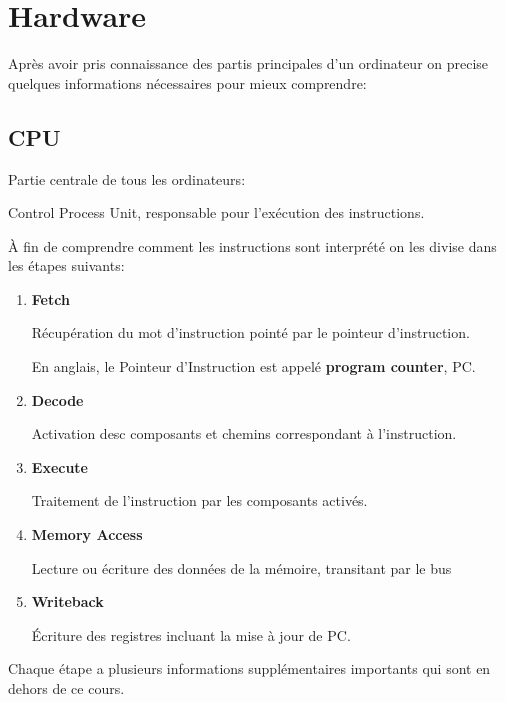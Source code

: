 \documentclass{article}
\begin{document}
\section{Hardware}
Après avoir pris connaissance des partis principales d'un ordinateur on precise quelques informations nécessaires pour mieux comprendre:
\subsection{CPU}
Partie centrale de tous les ordinateurs:
\begin{definition}\label{def:CPU}
    Control Process Unit, responsable pour l'exécution des instructions.
\end{definition}
À fin de comprendre comment les instructions sont interprété on les divise dans les étapes suivants:
\begin{enumerate}[rightmargin=\leftmargin]
    \item \textbf{Fetch}
    \begin{definition}\label{def:fetch}
        Récupération du mot d'instruction pointé par le pointeur d'instruction.
    
    \end{definition}
    En anglais, le Pointeur d'Instruction est appelé \textbf{program counter}, PC.
    
    \item \textbf{Decode}
    \begin{definition}\label{def:decode}
        Activation desc composants et chemins correspondant à l'instruction.
    \end{definition}
    
    \item \textbf{Execute}
    \begin{definition}\label{def:execute}
        Traitement de l'instruction par les composants activés.
    \end{definition}
    
    \item \textbf{Memory Access}
    \begin{definition}\label{def:memoryAccess}
        Lecture ou écriture des données de la mémoire, transitant par le bus
    \end{definition}
    
    \item \textbf{Writeback}
    \begin{definition}\label{def:writeBack}
        Écriture des registres incluant la mise à jour de PC.
    \end{definition}
\end{enumerate}
Chaque étape a plusieurs informations supplémentaires importants qui sont en dehors de ce cours.
\end{document}
